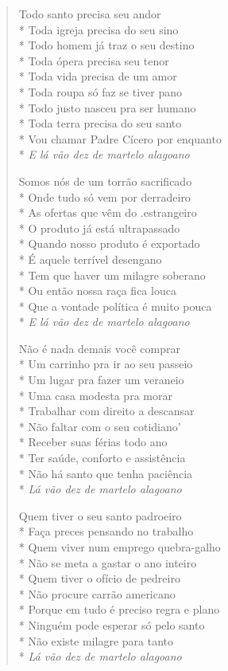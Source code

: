 \begin{verse}
Todo santo precisa seu andor\\*
Toda igreja precisa do seu sino\\*
Todo homem já traz o seu destino\\*
Toda ópera precisa seu tenor\\*
Toda vida precisa de um amor\\*
Toda roupa só faz se tiver pano\\*
Todo justo nasceu pra ser humano\\*
Toda terra precisa do seu santo\\*
Vou chamar Padre Cícero por enquanto\\*
\textit{E lá vão dez de martelo alagoano}

Somos nós de um torrão sacrificado\\*
Onde tudo só vem por derradeiro\\*
As ofertas que vêm do .estrangeiro\\*
O produto já está ultrapassado\\*
Quando nosso produto é exportado\\*
É aquele terrível desengano\\*
Tem que haver um milagre soberano\\*
Ou então nossa raça fica louca\\*
Que a vontade política é muito pouca\\*
\textit{E lá vão dez de martelo alagoano}

Não é nada demais você comprar\\*
Um carrinho pra ir ao seu passeio\\*
Um lugar pra fazer um veraneio\\*
Uma casa modesta pra morar\\*
Trabalhar com direito a descansar\\*
Não faltar com o seu cotidiano'\\*
Receber suas férias todo ano\\*
Ter saúde, conforto e assistência\\*
Não há santo que tenha paciência\\*
\textit{Lá vão dez de martelo alagoano}

Quem tiver o seu santo padroeiro\\*
Faça preces pensando no trabalho\\*
Quem viver num emprego quebra-galho\\*
Não se meta a gastar o ano inteiro\\*
Quem tiver o ofício de pedreiro\\*
Não procure carrão americano\\*
Porque em tudo é preciso regra e plano\\*
Ninguém pode esperar só pelo santo\\*
Não existe milagre para tanto\\*
\textit{Lá vão dez de martelo alagoano}


\end{verse}
